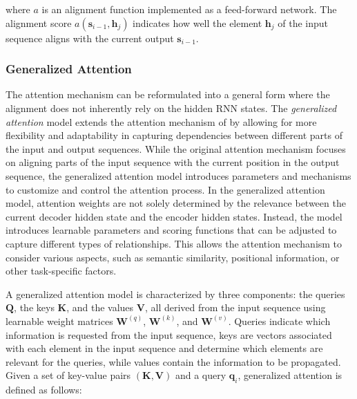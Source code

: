 
\noindent where $a$ is an alignment function implemented as a feed-forward network. The alignment score $a(\bm{s}_{i-1}, \bm{h}_j)$ indicates how well the element $\bm{h}_j$ of the input sequence aligns with the current output $\bm{s}_{i-1}$.

\subsubsection{Generalized Attention} 

The attention mechanism can be reformulated into a general form where the alignment does not inherently rely on the hidden \ac{RNN} states. The \textit{generalized attention} model \citep{chaudhari2021attentive} extends the attention mechanism of \citet{bahdanau2014neural} by allowing for more flexibility and adaptability in capturing dependencies between different parts of the input and output sequences. While the original attention mechanism focuses on aligning parts of the input sequence with the current position in the output sequence, the generalized attention model introduces parameters and mechanisms to customize and control the attention process. In the generalized attention model, attention weights are not solely determined by the relevance between the current decoder hidden state and the encoder hidden states. Instead, the model introduces learnable parameters and scoring functions that can be adjusted to capture different types of relationships. This allows the attention mechanism to consider various aspects, such as semantic similarity, positional information, or other task-specific factors.

A generalized attention model is characterized by three components: the queries $\bm{Q}$, the keys $\bm{K}$, and the values $\bm{V}$, all derived from the input sequence using learnable weight matrices $\bm{W}^{(q)}$, $\bm{W}^{(k)}$, and $\bm{W}^{(v)}$. Queries indicate which information is requested from the input sequence, keys are vectors associated with each element in the input sequence and determine which elements are relevant for the queries, while values contain the information to be propagated. Given a set of key-value pairs $(\bm{K}, \bm{V})$ and a query $\bm{q}_i$, generalized attention is defined as follows:

